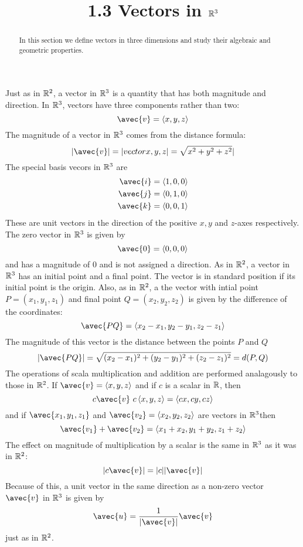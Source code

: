 \documentclass[handout]{ximera}
\title{1.3 Vectors in $\mathbb R^3$}
\begin{document}
\begin{abstract}
In this section we define vectors in three dimensions and study their algebraic and geometric properties.
\end{abstract}
 
\maketitle

Just as in $\mathbb R^2$, a vector in $\mathbb R^3$ is a quantity that has both magnitude and direction.
In $\mathbb R^3$, vectors have three components rather than two:
\[
\avec{v} = \vector{x, y, z}
\]
The magnitude of a vector in $\mathbb R^3$ comes from the distance formula:
\[
|\avec{v}| = |vector{x, y, z}| = \sqrt{x^2 + y^2 + z^2}|
\]
The special basis vecors in $\mathbb R^3$ are
\begin{align*}
\avec{i} &= \vector{1, 0, 0}\\
\avec{j} &= \vector{0, 1, 0}\\
\avec{k} &= \vector{0, 0, 1}\\
\end{align*}
These are unit vectors in the direction of the positive $x, y$ and $z$-axes respectively.
The zero vector in $\mathbb R^3$ is given by
\[
\avec{0} = \vector{0,0,0}
\]
and has a magnitude of $0$ and is not assigned a direction.
As in $\mathbb R^2$, a vector in $\mathbb R^3$ has an initial point and a final point.  The vector is in standard position if its initial point is the origin.
Also, as in $\mathbb R^2$, a the vector with intial point $P = (x_1, y_1, z_1)$ and final point $Q = (x_2, y_2, z_2)$ is given by the difference of the coordinates:
\[
\avec{PQ} = \vector{x_2 - x_1, y_2-y_1, z_2-z_1}
\]
The magnitude of this vector is the distance between the points $P$ and $Q$
\[
|\avec{PQ}| = \sqrt{(x_2-x_1)^2 + (y_2-y_1)^2 +(z_2-z_1)^2} = d(P, Q)
\]
The operations of scala multiplication and addition are performed analagously to those in $\mathbb R^2$.
If $\avec{v} = \vector{x, y, z}$ and if $c$ is a scalar in $\mathbb R$, then
\[
c\avec{v} \ c\vector{x, y, z} = \vector{cx, cy, cz}
\]
and if $\avec{x_1, y_1, z_1}$ and $\avec{v_2} = \vector{x_2, y_2, z_2}$ are vectors in $\mathbb R^3$then
\[
\avec{v_1} + \avec{v_2} = \vector{x_1+x_2, y_1+y_2, z_1+z_2}
\]
The effect on magnitude of multiplication by a scalar is the same in $\mathbb R^3$ as it was in $\mathbb R^2$:
\[
|c\avec{v}| = |c| |\avec{v}|
\]
Because of this, a unit vector in the same direction as a non-zero vector $\avec{v}$ in $\mathbb R^3$ is given by
\[
\avec{u} = \frac{1}{|\avec{v}|} \avec{v}
\]
just as in $\mathbb R^2$.
\end{document}
